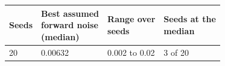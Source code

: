 \begin{tabular}{llll}
\toprule
Seeds & \shortstack[l]{Best assumed\\forward noise\\(median)} & \shortstack[l]{Range over\\seeds} & \shortstack[l]{Seeds at the\\median} \\
\midrule
20 & 0.00632 & 0.002 to 0.02 & 3 of 20 \\
\bottomrule
\end{tabular}
